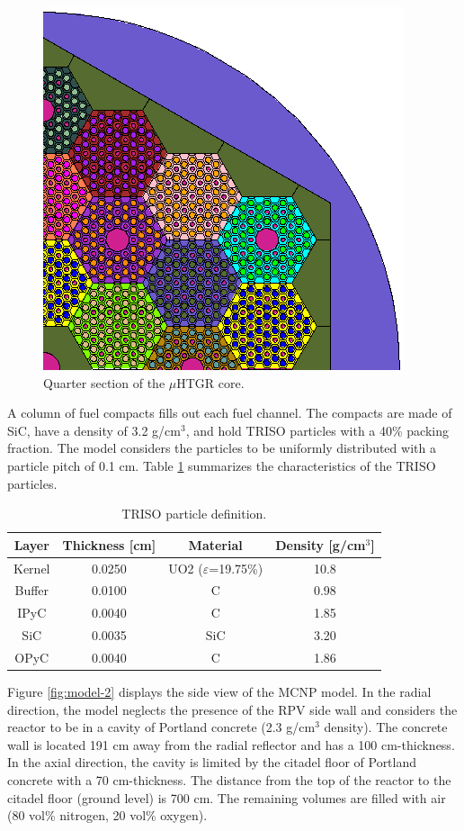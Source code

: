 \begin{figure}[htbp!]
  \begin{center}
    \includegraphics[width=0.60\linewidth]{figures/mcnp-diagram-1}
  \end{center}
  \caption{Quarter section of the $\mu$HTGR core.}
  \label{fig:model-1}
\end{figure}

A column of fuel compacts fills out each fuel channel.
The compacts are made of SiC, have a density of 3.2 g/cm$^3$, and hold TRISO particles with a 40\% packing fraction.
The model considers the particles to be uniformly distributed with a particle pitch of 0.1 cm.
Table \ref{table:description} summarizes the characteristics of the TRISO particles.

\begin{table}[!htb]
  \centering
  \caption{TRISO particle definition.}
  \label{table:description} 
  \begin{tabular}{cccc}
  \toprule
   Layer  & Thickness [cm] & Material & Density [g/cm$^3$] \\
  \midrule
   Kernel & 0.0250 & UO2 ($\varepsilon$=19.75\%) & 10.8 \\
   Buffer & 0.0100 & C & 0.98 \\
   IPyC   & 0.0040 & C & 1.85 \\
   SiC    & 0.0035 & SiC & 3.20 \\
   OPyC   & 0.0040 & C & 1.86 \\
  \bottomrule
  \end{tabular}
\end{table}

Figure \ref{fig:model-2} displays the side view of the MCNP model.
In the radial direction, the model neglects the presence of the RPV side wall and considers the reactor to be in a cavity of Portland concrete (2.3 g/cm$^3$ density).
The concrete wall is located 191 cm away from the radial reflector and has a 100 cm-thickness.
In the axial direction, the cavity is limited by the citadel floor of Portland concrete with a 70 cm-thickness.
The distance from the top of the reactor to the citadel floor (ground level) is 700 cm.
The remaining volumes are filled with air (80 vol\% nitrogen, 20 vol\% oxygen).

